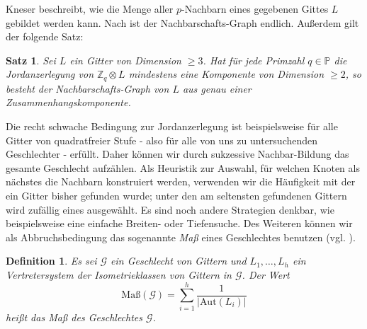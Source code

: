 \documentclass[12pt,a4paper,halfparskip,headsepline,bibtotocnumbered]{scrreprt}
\theoremstyle{nummermitklammern}
\newtheorem{definition}[defsatzusw]{Definition}
\newtheorem{satz}[defsatzusw]{Satz}
\theoremstyle{nonumberbreak}
\newcommand{\Z}{\mathbb{Z}}
\renewcommand{\P}{\mathbb{P}}
\newcommand{\Aut}{\text{Aut}}
\begin{document}
Kneser beschreibt, wie die Menge aller $p$-Nachbarn eines gegebenen Gittes $L$ gebildet werden kann.  Nach \cite{scharlau} ist der Nachbarschafts-Graph endlich. Außerdem gilt der folgende Satz:

\begin{framed}
	\begin{satz}\label{th:neighbourgraph}
		Sei $L$ ein Gitter von Dimension $\geq 3$. Hat für jede Primzahl $q \in \P$ die Jordanzerlegung von $\Z_q \otimes L$ mindestens eine Komponente von Dimension $\geq 2$, so besteht der Nachbarschafts-Graph von $L$ aus genau einer Zusammenhangskomponente.
	\end{satz}
\end{framed}

Die recht schwache Bedingung zur Jordanzerlegung ist beispielsweise für alle Gitter von quadratfreier Stufe - also für alle von uns zu untersuchenden Geschlechter - erfüllt. Daher können wir durch sukzessive Nachbar-Bildung das gesamte Geschlecht aufzählen. Als Heuristik zur Auswahl, für welchen Knoten als nächstes die Nachbarn konstruiert werden, verwenden wir die Häufigkeit mit der ein Gitter bisher gefunden wurde; unter den am seltensten gefundenen Gittern wird zufällig eines ausgewählt. Es sind noch andere Strategien denkbar, wie beispielsweise eine einfache Breiten- oder Tiefensuche. Des Weiteren können wir als Abbruchsbedingung das sogenannte \textit{Maß} eines Geschlechtes benutzen (vgl. \cite[Abschnitt 35]{kneser}).

\begin{framed}
	\begin{definition}
		Es sei $\mathcal{G}$ ein Geschlecht von Gittern und $L_1, \dots, L_h$ ein Vertretersystem der Isometrieklassen von Gittern in $\mathcal{G}$. Der Wert
		\begin{equation*}
			\text{Maß}(\mathcal{G}) = \sum_{i=1}^h \frac{1}{\vert \Aut(L_i) \vert}
		\end{equation*}
		heißt das \textit{Maß} des Geschlechtes $\mathcal{G}$.
	\end{definition}
\end{framed}
\end{document}
